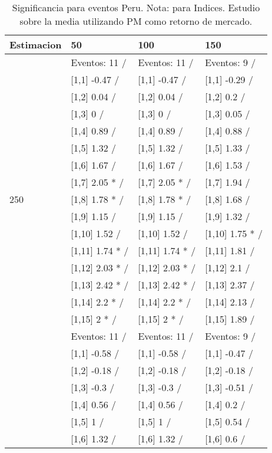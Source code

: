 \begin{table}

\caption{Significancia para eventos Peru. Nota: para Indices. Estudio sobre la media utilizando PM como retorno de mercado.}
\centering
\begin{tabular}[t]{llll}
\toprule
Estimacion & 50 & 100 & 150\\
\midrule
 & Eventos:  11 / & Eventos:  11 / & Eventos:  9 /\\
 & {}[1,1] -0.47  / & {}[1,1] -0.47  / & {}[1,1] -0.29  /\\
 & {}[1,2] 0.04  / & {}[1,2] 0.04  / & {}[1,2] 0.2  /\\
 & {}[1,3] 0  / & {}[1,3] 0  / & {}[1,3] 0.05  /\\
 & {}[1,4] 0.89  / & {}[1,4] 0.89  / & {}[1,4] 0.88  /\\
\addlinespace
 & {}[1,5] 1.32  / & {}[1,5] 1.32  / & {}[1,5] 1.33  /\\
 & {}[1,6] 1.67  / & {}[1,6] 1.67  / & {}[1,6] 1.53  /\\
 & {}[1,7] 2.05 * / & {}[1,7] 2.05 * / & {}[1,7] 1.94  /\\
250 & {}[1,8] 1.78 * / & {}[1,8] 1.78 * / & {}[1,8] 1.68  /\\
 & {}[1,9] 1.15  / & {}[1,9] 1.15  / & {}[1,9] 1.32  /\\
\addlinespace
 & {}[1,10] 1.52  / & {}[1,10] 1.52  / & {}[1,10] 1.75 * /\\
 & {}[1,11] 1.74 * / & {}[1,11] 1.74 * / & {}[1,11] 1.81  /\\
 & {}[1,12] 2.03 * / & {}[1,12] 2.03 * / & {}[1,12] 2.1  /\\
 & {}[1,13] 2.42 * / & {}[1,13] 2.42 * / & {}[1,13] 2.37  /\\
 & {}[1,14] 2.2 * / & {}[1,14] 2.2 * / & {}[1,14] 2.13  /\\
\addlinespace
 & {}[1,15] 2 * / & {}[1,15] 2 * / & {}[1,15] 1.89  /\\
 & Eventos:  11 / & Eventos:  11 / & Eventos:  9 /\\
 & {}[1,1] -0.58  / & {}[1,1] -0.58  / & {}[1,1] -0.47  /\\
 & {}[1,2] -0.18  / & {}[1,2] -0.18  / & {}[1,2] -0.18  /\\
 & {}[1,3] -0.3  / & {}[1,3] -0.3  / & {}[1,3] -0.51  /\\
\addlinespace
 & {}[1,4] 0.56  / & {}[1,4] 0.56  / & {}[1,4] 0.2  /\\
 & {}[1,5] 1  / & {}[1,5] 1  / & {}[1,5] 0.54  /\\
 & {}[1,6] 1.32  / & {}[1,6] 1.32  / & {}[1,6] 0.6  /\\

\end{tabular}
\end{table}
